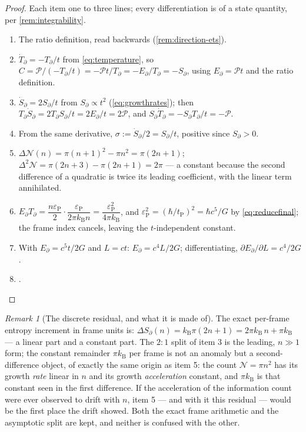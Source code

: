\documentclass[11pt]{amsbook}
\theoremstyle{plain}
\theoremstyle{definition}
\theoremstyle{remark}
\newtheorem{remark}[theorem]{Remark}
\begin{document}
\begin{proof}
Each item one to three lines; every differentiation is of a state quantity, per \cref{rem:integrability}.
\begin{enumerate}
\item The ratio definition, read backwards (\cref{rem:direction-ets}).
\item $\dot T_{\partial} = -T_{\partial}/t$ from \cref{eq:temperature}, so $C = \mathcal P/(-T_{\partial}/t) = -\mathcal P t/T_{\partial} = -E_{\partial}/T_{\partial} = -S_{\partial}$, using $E_{\partial} = \mathcal P t$ and the ratio definition.
\item $\dot S_{\partial} = 2S_{\partial}/t$ from $S_{\partial} \propto t^{2}$ (\cref{eq:growthrates}); then $T_{\partial}\dot S_{\partial} = 2T_{\partial}S_{\partial}/t = 2E_{\partial}/t = 2\mathcal P$, and $S_{\partial}\dot T_{\partial} = -S_{\partial}T_{\partial}/t = -\mathcal P$.
\item From the same derivative, $\sigma := \dot S_{\partial}/2 = S_{\partial}/t$, positive since $S_{\partial} > 0$.
\item $\Delta \mathcal N(n) = \pi(n+1)^{2} - \pi n^{2} = \pi(2n+1)$; $\Delta^{2}\mathcal N = \pi(2n+3) - \pi(2n+1) = 2\pi$ --- a constant because the second difference of a quadratic is twice its leading coefficient, with the linear term annihilated.
\item $E_{\partial}T_{\partial} = \dfrac{n\varepsilon_{\mathrm P}}{2}\cdot\dfrac{\varepsilon_{\mathrm P}}{2\pi k_{\mathrm B}n} = \dfrac{\varepsilon_{\mathrm P}^{2}}{4\pi k_{\mathrm B}}$, and $\varepsilon_{\mathrm P}^{2} = (\hbar/t_{\mathrm P})^{2} = \hbar c^{5}/G$ by \cref{eq:reducefinal}; the frame index cancels, leaving the $t$-independent constant.
\item With $E_{\partial} = c^{5}t/2G$ and $L = ct$: $E_{\partial} = c^{4}L/2G$; differentiating, $\partial E_{\partial}/\partial L = c^{4}/2G$.
\item {}.
\end{enumerate}
\end{proof}

\begin{remark}[The discrete residual, and what it is made of]\label{rem:discrete-residual}
The exact per-frame entropy increment in frame units is: $\Delta S_{\partial}(n) = k_{\mathrm B}\pi(2n+1) = 2\pi k_{\mathrm B}\,n + \pi k_{\mathrm B}$ --- a linear part and a constant part. The $2{:}1$ split of item 3 is the leading, $n \gg 1$ form; the constant remainder $\pi k_{\mathrm B}$ per frame is not an anomaly but a second-difference object, of exactly the same origin as item 5: the count $\mathcal N = \pi n^{2}$ has its growth \emph{rate} linear in $n$ and its growth \emph{acceleration} constant, and $\pi k_{\mathrm B}$ is that constant seen in the first difference. If the acceleration of the information count were ever observed to drift with $n$, item 5 --- and with it this residual --- would be the first place the drift showed. Both the exact frame arithmetic and the asymptotic split are kept, and neither is confused with the other.
\end{remark}
\end{document}
